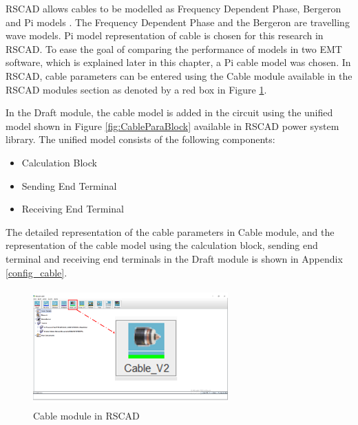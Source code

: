 RSCAD allows cables to be modelled as Frequency Dependent Phase, Bergeron and Pi models \cite{rtds_tech}. The Frequency Dependent Phase and the Bergeron are travelling wave models. Pi model representation of cable is chosen for this research in RSCAD. To ease the goal of comparing the performance of models in two \gls{EMT} software, which is explained later in this chapter, a Pi cable model was chosen. In RSCAD, cable parameters can be entered using the Cable module available in the RSCAD modules section as denoted by a red box in Figure \ref{fig:CableModule_mark}. 

 
In the Draft module, the cable model is added in the circuit using the unified model shown in Figure \ref{fig:CableParaBlock} available in RSCAD power system library. The unified model consists of the following components: 
    \begin{itemize}[noitemsep]
    \item Calculation Block
    \item Sending End Terminal
    \item Receiving End Terminal
\end{itemize}

The detailed representation of the cable parameters in Cable module, and the representation of the cable model using the calculation block, sending end terminal and receiving end terminals in the Draft module is shown in Appendix \ref{config_cable}.

\begin{figure}[H]
\centering
    \includegraphics[height = 4.5cm,width = 7.5cm]{Diagrams/Chapter_3/Cable_module_Final.png}
    \caption{Cable module in RSCAD}
    \label{fig:CableModule_mark}
\end{figure}


